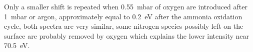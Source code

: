 Only a smaller shift is repeated when \qty{0.55}{\milli\bar} of oxygen are introduced after \qty{1}{\milli\bar} or argon, approximately equal to \qty{0.2}{\eV} after the ammonia oxidation cycle, both spectra are very similar, some nitrogen species possibly left on the surface are probably removed by oxygen which explains the lower intensity near \qty{70.5}{\eV}.


